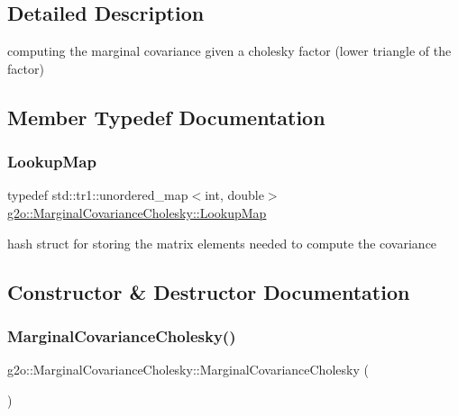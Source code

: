 \subsection{Detailed Description}
computing the marginal covariance given a cholesky factor (lower triangle of the factor) 

\subsection{Member Typedef Documentation}
\mbox{\label{classg2o_1_1_marginal_covariance_cholesky_a9925dd2e45479a7feb783ff71d93fdbc}} 
\subsubsection{\texorpdfstring{Lookup\+Map}{LookupMap}}
{\footnotesize\ttfamily typedef std\+::tr1\+::unordered\+\_\+map$<$int, double$>$ \mbox{\hyperlink{classg2o_1_1_marginal_covariance_cholesky_a9925dd2e45479a7feb783ff71d93fdbc}{g2o\+::\+Marginal\+Covariance\+Cholesky\+::\+Lookup\+Map}}\hspace{0.3cm}{\ttfamily [protected]}}

hash struct for storing the matrix elements needed to compute the covariance 

\subsection{Constructor \& Destructor Documentation}
\mbox{\label{classg2o_1_1_marginal_covariance_cholesky_a1fab5946726badbb38c2b2aa54a0118c}} 
\subsubsection{\texorpdfstring{Marginal\+Covariance\+Cholesky()}{MarginalCovarianceCholesky()}}
{\footnotesize\ttfamily g2o\+::\+Marginal\+Covariance\+Cholesky\+::\+Marginal\+Covariance\+Cholesky (\begin{DoxyParamCaption}{ }\end{DoxyParamCaption})}

